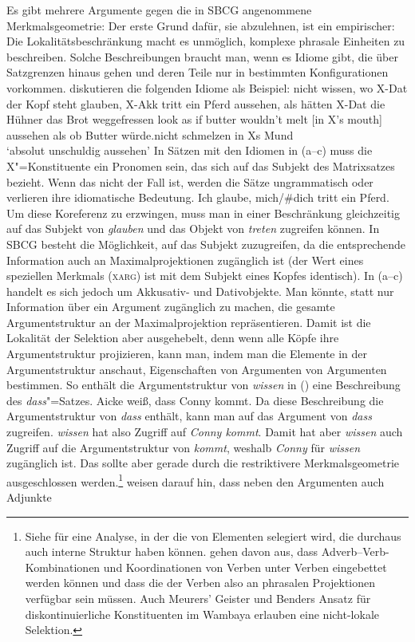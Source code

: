 Es gibt mehrere Argumente gegen die in SBCG angenommene Merkmalsgeometrie: Der erste Grund dafür,
sie abzulehnen, ist ein empirischer: Die Lokalitätsbeschränkung macht es unmöglich, komplexe
phrasale Einheiten zu beschreiben. Solche Beschreibungen braucht man, wenn es Idiome gibt, die über
Satzgrenzen hinaus gehen und deren Teile nur in bestimmten Konfigurationen
vorkommen.  diskutieren die folgenden Idiome als Beispiel:
\largerpage[2]
\eal
\ex nicht wissen, wo X-Dat der Kopf steht
\ex\label{mich-tritt-ein-Pferd}
glauben, X-Akk tritt ein Pferd
\ex aussehen, als hätten X-Dat die Hühner das Brot weggefressen
\ex
\gll look as if butter wouldn't melt [in X's mouth]\\
     aussehen als ob Butter würde.nicht schmelzen \hphantom{[}in Xs Mund\\
\glt `absolut unschuldig aussehen'
\zl
In Sätzen mit den Idiomen in (a--c) muss die X"=Konstituente ein Pronomen sein, das sich auf
das Subjekt des Matrixsatzes bezieht. Wenn das nicht der Fall ist, werden die Sätze ungrammatisch
oder verlieren ihre idiomatische Bedeutung.
\ea
Ich glaube, mich/\#dich tritt ein Pferd.
\z
Um diese Koreferenz zu erzwingen, muss man in einer Beschränkung gleichzeitig auf das Subjekt von
\emph{glauben} und das Objekt von \emph{treten} zugreifen können. In SBCG besteht die Möglichkeit,
auf das Subjekt zuzugreifen, da die entsprechende Information auch an Maximalprojektionen zugänglich
ist (der Wert eines speziellen Merkmals (\textsc{xarg}) ist mit dem Subjekt eines Kopfes identisch). In
(a--c) handelt es sich jedoch um Akkusativ- und Dativobjekte. Man könnte, statt nur
Information über ein Argument zugänglich zu machen, die gesamte Argumentstruktur an der
Maximalprojektion repräsentieren. Damit ist die Lokalität der Selektion aber ausgehebelt, denn wenn
alle Köpfe ihre Argumentstruktur projizieren, kann man, indem man die Elemente in der
Argumentstruktur anschaut, Eigenschaften von Argumenten von Argumenten bestimmen. So enthält \zb die
Argumentstruktur von \emph{wissen} in () eine Beschreibung des \emph{dass}"=Satzes.
\ea
Aicke weiß, dass Conny kommt.
\z
Da diese Beschreibung die Argumentstruktur von \emph{dass} enthält, kann man auf das Argument von
\emph{dass} zugreifen. \emph{wissen} hat also Zugriff auf \emph{Conny kommt}. Damit hat aber
\emph{wissen} auch Zugriff auf die Argumentstruktur von \emph{kommt}, weshalb \emph{Conny} für
\emph{wissen} zugänglich ist. Das sollte aber gerade durch die restriktivere Merkmalsgeometrie
ausgeschlossen werden.\footnote{%
  Siehe \citet*[15--16]{AGS1998a} für eine Analyse, in der die \argstl von Elementen selegiert wird,
  die durchaus auch interne Struktur haben können. \citet[328,332]{AG2000a} gehen davon aus, dass
  Adverb--Verb-Kombinationen und Koordinationen von Verben unter Verben eingebettet werden können
  und dass die \argstl der Verben also an phrasalen Projektionen verfügbar sein müssen. Auch
  Meurers' Geister \citeyearpar{Meurers99b} und Benders Ansatz \citeyearpar{Bender2008a} für
  diskontinuierliche Konstituenten im Wambaya erlauben eine nicht-lokale Selektion.%
} \citeauthor{RS2009a} weisen darauf hin, dass neben den Argumenten auch Adjunkte
